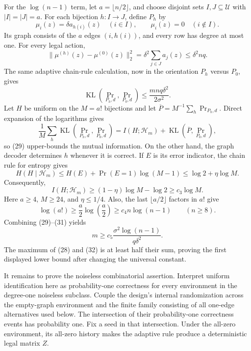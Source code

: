 For the \(\log(n-1)\) term, let \(a=\lfloor n/2\rfloor\), and choose disjoint sets \(I,J\subseteq\mathcal U\) with \(|I|=|J|=a\).  For each bijection \(h:I\to J\), define \(P_h\) by
\[
 \mu_i(z)=\delta a_{h(i)}(z)\quad(i\in I),
 \qquad
 \mu_i(z)=0\quad(i\notin I).
\]
Its graph consists of the \(a\) edges \((i,h(i))\), and every row has degree at most one.  For every legal action,
\[
 \lVert\mu^{(h)}(z)-\mu^{(0)}(z)\rVert_2^2
 =\delta^2\sum_{j\in J}a_j(z)
 \le\delta^2nq.
\]
The same adaptive chain-rule calculation, now in the orientation \(P_h\) versus \(P_0\), gives
\[
 \operatorname{KL}(\Pr_{P_h,d},\Pr_{P_0,d})
 \le\frac{mnq\delta^2}{2\sigma^2}.                                   \tag{29}
\]
Let \(H\) be uniform on the \(M=a!\) bijections and let \(\overline P=M^{-1}\sum_h\Pr_{P_h,d}\).  Direct expansion of the logarithms gives
\[
 \frac1M\sum_h\operatorname{KL}(\Pr_{P_h,d},\Pr_{P_0,d})
 =I(H;\mathscr H_m)+\operatorname{KL}(\overline P,\Pr_{P_0,d}),
\]
so (29) upper-bounds the mutual information.  On the other hand, the graph decoder determines \(h\) whenever it is correct.  If \(E\) is its error indicator, the chain rule for entropy gives
\[
 H(H\mid\mathscr H_m)
 \le H(E)+\Pr(E=1)\log(M-1)
 \le\log2+\eta\log M.
\]
Consequently,
\[
 I(H;\mathscr H_m)
 \ge(1-\eta)\log M-\log2
 \ge c_3\log M.                                                       \tag{30}
\]
Here \(a\ge4\), \(M\ge24\), and \(\eta\le1/4\).  Also, the last \(\lfloor a/2\rfloor\) factors in \(a!\) give
\[
 \log(a!)\ge\frac a2\log\!\left(\frac a2\right)
 \ge c_4n\log(n-1)\qquad(n\ge8).                                    \tag{31}
\]
Combining (29)--(31) yields
\[
 m\ge c_5\frac{\sigma^2\log(n-1)}{q\delta^2}.                        \tag{32}
\]
The maximum of (28) and (32) is at least half their sum, proving the first displayed lower bound after changing the universal constant.

It remains to prove the noiseless combinatorial assertion.  Interpret uniform identification here as probability-one correctness for every environment in the degree-one noiseless subclass.  Couple the design's internal randomization across the empty-graph environment and the finite family consisting of all one-edge alternatives used below.  The intersection of their probability-one correctness events has probability one.  Fix a seed in that intersection.  Under the all-zero environment, its all-zero history makes the adaptive rule produce a deterministic legal matrix \(Z\).

